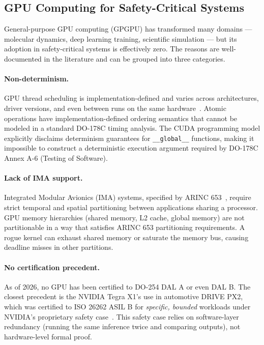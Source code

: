 \documentclass[conference]{IEEEtran}
\begin{document}
\subsection{GPU Computing for Safety-Critical Systems}
\label{sec:related-gpu}

General-purpose GPU computing (GPGPU) has transformed many domains —
molecular dynamics, deep learning training, scientific simulation — but
its adoption in safety-critical systems is effectively zero. The reasons
are well-documented in the literature and can be grouped into three
categories.

\paragraph{Non-determinism.}
GPU thread scheduling is implementation-defined and varies across
architectures, driver versions, and even between runs on the same
hardware~\cite{betts2011 gpu_verify}. Atomic operations have
implementation-defined ordering semantics that cannot be modeled in a
standard DO-178C timing analysis. The CUDA programming model explicitly
disclaims determinism guarantees for \texttt{\_\_global\_\_} functions,
making it impossible to construct a deterministic execution argument
required by DO-178C Annex A-6 (Testing of Software).

\paragraph{Lack of IMA support.}
Integrated Modular Avionics (IMA) systems, specified by ARINC
653~\cite{arinc653}, require strict temporal and spatial partitioning
between applications sharing a processor. GPU memory hierarchies
(shared memory, L2 cache, global memory) are not partitionable in a way
that satisfies ARINC 653 partitioning requirements. A rogue kernel can
exhaust shared memory or saturate the memory bus, causing deadline misses
in other partitions.

\paragraph{No certification precedent.}
As of 2026, no GPU has been certified to DO-254 DAL A or even DAL B.
The closest precedent is the NVIDIA Tegra X1's use in automotive
DRIVE PX2, which was certified to ISO 26262 ASIL B for \emph{specific,
bounded} workloads under NVIDIA's proprietary safety
case~\cite{nvidia2020safety}. This safety case relies on software-layer
redundancy (running the same inference twice and comparing outputs), not
hardware-level formal proof.
\end{document}
